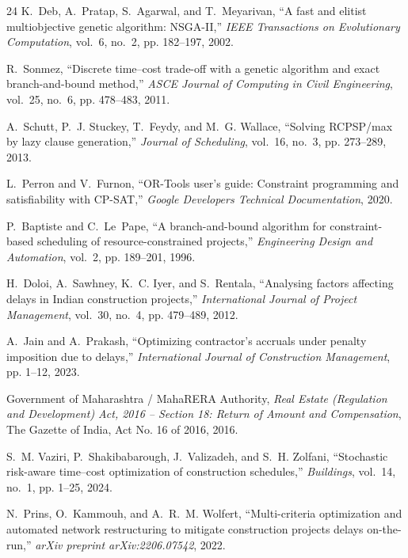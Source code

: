 \documentclass[conference]{IEEEtran}
\begin{document}
\begin{thebibliography}{24}
K.~Deb, A.~Pratap, S.~Agarwal, and T.~Meyarivan, ``A fast and elitist multiobjective genetic algorithm: {NSGA-II},'' \emph{IEEE Transactions on Evolutionary Computation}, vol.~6, no.~2, pp. 182--197, 2002.

R.~Sonmez, ``Discrete time--cost trade-off with a genetic algorithm and exact branch-and-bound method,'' \emph{ASCE Journal of Computing in Civil Engineering}, vol.~25, no.~6, pp. 478--483, 2011.

A.~Schutt, P.~J. Stuckey, T.~Feydy, and M.~G. Wallace, ``Solving {RCPSP/max} by lazy clause generation,'' \emph{Journal of Scheduling}, vol.~16, no.~3, pp. 273--289, 2013.

L.~Perron and V.~Furnon, ``{OR-Tools} user's guide: Constraint programming and satisfiability with {CP-SAT},'' \emph{Google Developers Technical Documentation}, 2020.

P.~Baptiste and C.~Le~Pape, ``A branch-and-bound algorithm for constraint-based scheduling of resource-constrained projects,'' \emph{Engineering Design and Automation}, vol.~2, pp. 189--201, 1996.

H.~Doloi, A.~Sawhney, K.~C. Iyer, and S.~Rentala, ``Analysing factors affecting delays in Indian construction projects,'' \emph{International Journal of Project Management}, vol.~30, no.~4, pp. 479--489, 2012.

A.~Jain and A.~Prakash, ``Optimizing contractor's accruals under penalty imposition due to delays,'' \emph{International Journal of Construction Management}, pp. 1--12, 2023.

{Government of Maharashtra / MahaRERA Authority}, \emph{{Real Estate (Regulation and Development) Act, 2016 -- Section 18: Return of Amount and Compensation}}, The Gazette of India, Act No. 16 of 2016, 2016.

S.~M. Vaziri, P.~Shakibabarough, J.~Valizadeh, and S.~H. Zolfani, ``Stochastic risk-aware time--cost optimization of construction schedules,'' \emph{Buildings}, vol.~14, no.~1, pp. 1--25, 2024.

N.~Prins, O.~Kammouh, and A.~R.~M. Wolfert, ``Multi-criteria optimization and automated network restructuring to mitigate construction projects delays on-the-run,'' \emph{arXiv preprint arXiv:2206.07542}, 2022.


\end{thebibliography}
\end{document}
